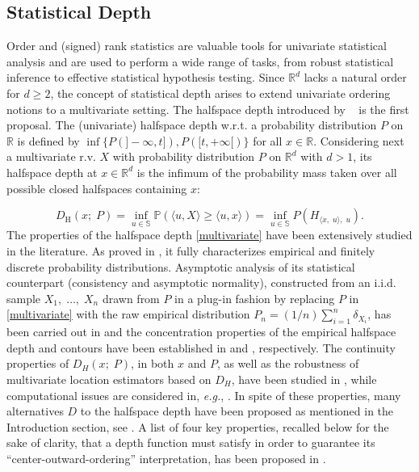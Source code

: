 \documentclass{article}
\numberwithin{equation}{section}
\newcommand{\sphere}{\mathbb{S}}
\begin{document}
\subsection{Statistical Depth}\label{subsec:depth_basics}
%

Order and (signed) rank statistics are valuable tools for univariate
statistical analysis and are used to perform a wide range of tasks,
from robust statistical inference to effective statistical hypothesis
testing.
Since $\mathbb{R}^d$ lacks a natural order for $d \geq 2$, the
concept of statistical depth arises to extend univariate ordering
notions to a multivariate setting.
The halfspace depth introduced by ~\cite{Tukey75} is the first
proposal. The (univariate) halfspace depth w.r.t. a probability
distribution $P$ on $\mathbb{R}$ is defined by $ \inf \{ P(]-\infty,
t]), P([t,+\infty [)\}$ for all $x\in \mathbb{R}$.
Considering next a multivariate r.v. $X$ with probability
distribution $P$ on $\mathbb{R}^d$ with $d>1$, its halfspace depth at
$x\in \mathbb{R}^d$ is the infimum of the probability mass taken over
all possible closed halfspaces containing $x$:

\begin{equation}\label{multivariate}
    D_{\mathrm{H}}(x;\; P) = \underset{u\in \sphere}{\inf}
    \mathbb{P} \left( \langle u,X\rangle  \geq  \langle u,x\rangle
    \right)= \underset{u\in \sphere}{\inf} P \left(
    {H}_{\langle x,\; u\rangle,\; u}\right).
\end{equation}
The properties of the halfspace depth \eqref{multivariate} have been
extensively studied in the literature. As proved in
\cite{StruyfR99,Koshevoy02}, it fully characterizes empirical and
finitely discrete probability distributions. Asymptotic analysis of
its statistical counterpart (consistency and asymptotic normality),
constructed from an i.i.d. sample $X_1,\; \ldots,\; X_n$ drawn from
$P$ in a plug-in fashion by replacing $P$ in \eqref{multivariate}
with the raw empirical distribution
${P}_n=(1/n)\sum_{i=1}^n\delta_{X_i}$,  has been carried out in
\cite{Donoho82, RousseeuwS98,ZuoS00a} and the concentration properties of the
empirical halfspace depth and contours have been established in
\cite{BurrF17} and \cite{Brunel19}, respectively. The continuity
properties of $D_H(x;\; P)$, in both \(x\) and \(P\), as well as the
robustness of multivariate location estimators based on $D_H$, have
been studied in \cite{DonohoG92}, while computational issues are
considered in, \textit{e.g.}, \cite{LiuZ14a, dyckerhoff2016exact, LiuMM18}.
In spite of these properties, many alternatives $D$ to the halfspace
depth have been proposed as mentioned in the Introduction section,
see \cite{mosler2022choosing}. A list of four key properties, recalled below
for the sake of clarity, that a depth function must satisfy in order
to guarantee its “center-outward-ordering” interpretation, has been
proposed in \cite{ZuoS00a}.
\end{document}
